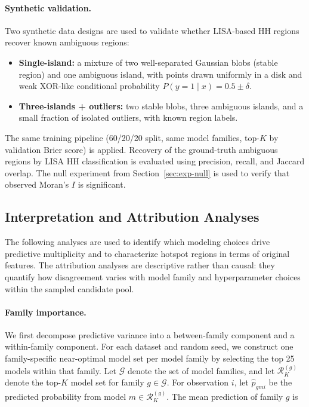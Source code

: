 \paragraph{Synthetic validation.}
Two synthetic data designs are used to validate whether LISA-based HH regions recover
known ambiguous regions:
\begin{itemize}
    \item \textbf{Single-island:} a mixture of two well-separated Gaussian blobs (stable region) and one ambiguous island, with points drawn uniformly in a disk and weak XOR-like conditional probability $P(y=1\mid x) = 0.5 \pm \delta$.
    \item \textbf{Three-islands + outliers:} two stable blobs, three ambiguous islands, and a small fraction of isolated outliers, with known region labels.
\end{itemize}
The same training pipeline (60/20/20 split, same model families, top-$K$ by validation
Brier score) is applied. Recovery of the ground-truth ambiguous regions by LISA HH
classification is evaluated using precision, recall, and Jaccard overlap. The null
experiment from Section~\ref{sec:exp-null} is used to verify that observed Moran's $I$ is
significant.

\subsection{Interpretation and Attribution Analyses}

The following analyses are used to identify which modeling choices drive predictive multiplicity and to characterize hotspot regions in terms of original features. The attribution analyses are descriptive rather than causal: they quantify how disagreement varies with model family and hyperparameter choices within the sampled candidate pool.

\paragraph{Family importance.}

We first decompose predictive variance into a between-family component and a
within-family component. For each dataset and random seed, we construct one
family-specific near-optimal model set per model family by selecting the top 25 models
within that family. Let \(\mathcal{G}\) denote the set of model families, and let
\(\mathcal{R}^{(g)}_K\) denote the top-\(K\) model set for family \(g \in \mathcal{G}\).
For observation \(i\), let \(\hat{p}_{gmi}\) be the predicted probability from model
\(m \in \mathcal{R}^{(g)}_K\). The mean prediction of family \(g\) is

